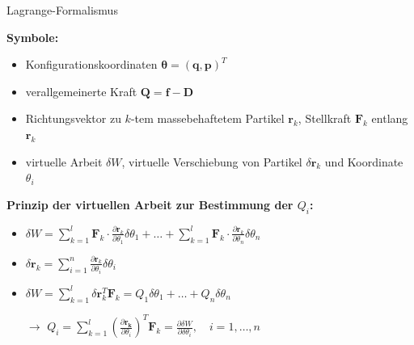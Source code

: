 \documentclass[
	ngerman,
	10pt,				%
	aspectratio=169 	%
]{beamer}
\begin{document}
\begin{frame}[t,fragile,label=Lagrange2_2]{\large Lagrange-Formalismus}
	
	\textbf{Symbole:}
	\begin{itemize}
		\item Konfigurationskoordinaten $\boldsymbol{\theta} = (\mathbf{q}, \mathbf{p})^T$
		\item verallgemeinerte Kraft $\mathbf{Q} = \mathbf{f} - \mathbf{D}$
		\pause
		\item Richtungsvektor zu $k$-tem massebehaftetem Partikel $\mathbf{r}_k$, Stellkraft $\mathbf{F}_k$ entlang $\mathbf{r}_k$
		\pause
		\item virtuelle Arbeit $\delta W$, virtuelle Verschiebung von Partikel $\delta \mathbf{r}_k$ und Koordinate $\theta_{i}$
	\end{itemize}
	
	\pause
	\bigskip
	\textbf{Prinzip der virtuellen Arbeit zur Bestimmung der $Q_i$:}
	\begin{itemize}
		\pause
		\item  $\delta W = \sum_{k=1}^l \mathbf{F}_k \cdot \frac{\partial \mathbf{r}_k}{\partial \theta_1} \delta \theta_1 +\ldots + \sum_{k=1}^l \mathbf{F}_k \cdot \frac{\partial \mathbf{r}_k}{\partial \theta_n} \delta \theta_n$
		\pause
		\item $\delta \mathbf{r}_{k} = \sum_{i = 1}^{n} \frac{\partial\mathbf{r}_{k}}{\partial\theta_i} \delta \theta_i$
		\pause
		\item $\delta W = \sum_{k=1}^{l}\delta \mathbf{r}_k^T \mathbf{F}_k = Q_1 \delta \theta_1 + \ldots + Q_n\delta \theta_n$
		\pause
		\item[$\rightarrow$] $Q_i = \sum_{k=1}^l \left(\frac {\partial \mathbf{r_k}} {\partial \theta_i} \right)^T \mathbf {F}_{k} = \frac{\partial\delta W}{\partial \delta \theta_i} ,\quad i=1,\ldots, n$
	\end{itemize}
	
\end{frame}

\end{document}
